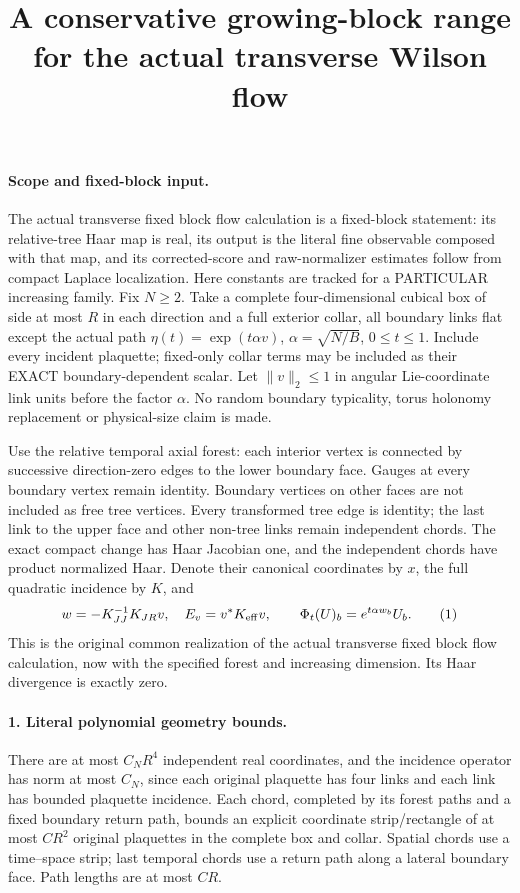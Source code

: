 \documentclass[11pt]{article}
\title{A conservative growing-block range for the actual transverse Wilson flow}\author{}\date{}
\begin{document}
\maketitle
\paragraph{Scope and fixed-block input.}
The actual transverse fixed block flow calculation is a fixed-block statement: its relative-tree Haar map is real,
its output is the literal fine observable composed with that map, and its
corrected-score and raw-normalizer estimates follow from compact Laplace
localization. Here constants are tracked for a PARTICULAR increasing family.
Fix $N\ge2$. Take a complete four-dimensional cubical box of side at most $R$
in each direction and a full exterior collar, all boundary links flat except
the actual path $\eta(t)=\exp(t\alpha v)$, $\alpha=\sqrt{N/B}$,
$0\le t\le1$. Include every incident plaquette; fixed-only collar terms may
be included as their EXACT boundary-dependent scalar. Let $\|v\|_2\le1$ in
angular Lie-coordinate link units before the factor $\alpha$. No random
boundary typicality, torus holonomy replacement or physical-size claim is made.

Use the relative temporal axial forest: each interior vertex is connected by
successive direction-zero edges to the lower boundary face. Gauges at every
boundary vertex remain identity. Boundary vertices on other faces are not
included as free tree vertices. Every transformed tree edge is identity;
the last link to the upper face and other non-tree links remain independent
chords. The exact compact change has Haar Jacobian one, and the independent
chords have product normalized Haar. Denote their canonical coordinates by
$x$, the full quadratic incidence by $K$, and
\[
 w=-K_{JJ}^{-1}K_{JR}v,\quad E_v=v^*K_{\rm eff}v,\qquad
 \Phi_t(U)_b=e^{t\alpha w_b}U_b.                                       \tag{1}
\]
This is the original common realization of the actual transverse fixed block flow calculation, now with the specified
forest and increasing dimension. Its Haar divergence is exactly zero.

\paragraph{1. Literal polynomial geometry bounds.}
There are at most $C_NR^4$ independent real coordinates, and the incidence
operator has norm at most $C_N$, since each original plaquette has four links
and each link has bounded plaquette incidence. Each chord, completed by its
forest paths and a fixed boundary return path, bounds an explicit coordinate
strip/rectangle of at most $C R^2$ original plaquettes in the complete box
and collar. Spatial chords use a time--space strip; last temporal chords use
a return path along a lateral boundary face. Path lengths are at most $CR$.
\end{document}
